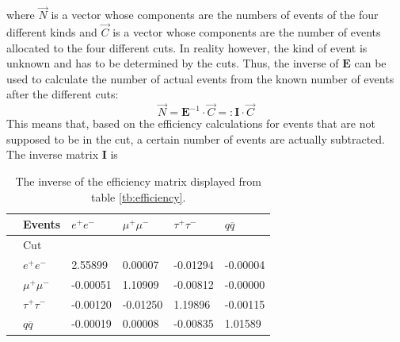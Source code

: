 where $\vec{N}$ is a vector whose components are the numbers of events of the four different kinds and $\vec{C}$ is a vector whose components are the number of events allocated to the four different cuts. 
In reality however, the kind of event is unknown and has to be determined by the cuts. Thus, the inverse of $\boldsymbol{E}$ can be used to calculate the number of actual events from the known number of events after the different cuts:
\begin{equation}
\vec{N}=\boldsymbol{E}^{-1}\cdot\vec{C}=:\boldsymbol{I}\cdot\vec{C}
\label{eq:numberevents}
\end{equation}
This means that, based on the efficiency calculations for events that are not supposed to be in the cut, a certain number of events are actually subtracted.
The inverse matrix $\boldsymbol{I}$ is
\begin{table}[H]\centering
	\begin{tabular}{@{}llllll@{}}
		\toprule
		&Events &$e^+e^-$&$\mu^+\mu^-$&$\tau^+\tau^-$&$q\overline{q}$\\
		\midrule
		&Cut&&&&\\
		&$e^+e^-$&2.55899&0.00007&-0.01294&-0.00004\\
		&$\mu^+\mu^-$&-0.00051&1.10909&-0.00812&-0.00000\\
		&$\tau^+\tau^-$&-0.00120&-0.01250&1.19896&-0.00115\\
		&$q\overline{q}$&-0.00019&0.00008&-0.00835&1.01589\\
		\bottomrule
	\end{tabular}
	\caption[Inverse efficiency matrix]{The inverse of the efficiency matrix displayed from table \ref{tb:efficiency}.}
	\label{tb:invefficiency}
\end{table}

